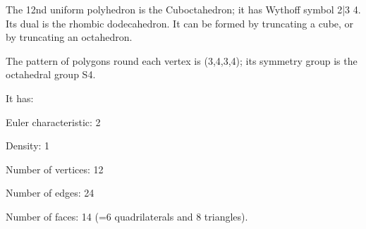 The 12nd uniform polyhedron is the Cuboctahedron; it has Wythoff symbol 2|3 4. 
Its dual is the rhombic dodecahedron. 
It can be formed by truncating a cube, or by truncating an
octahedron.

The pattern of polygons round each vertex is
 (3,4,3,4); its symmetry group is the octahedral group S4.\par
It has:\par
Euler
 characteristic: 2\par
Density: 1\par
Number of vertices: 12\par
Number of edges: 
 24\par
Number of faces: 14 (=6 quadrilaterals and 8 triangles).